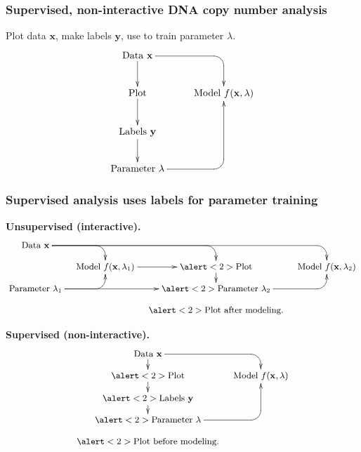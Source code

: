\documentclass{beamer}
\begin{document}
\begin{frame}
  \frametitle{Supervised, non-interactive DNA copy number analysis}
  Plot data $\mathbf x$, make labels $\mathbf y$, use to train
  parameter $\lambda$.
  \begin{displaymath}
  \xymatrix{
    \text{Data $\mathbf x$}
    \ar `[r] [dr] 
    \ar [d]
    & \text{ }
    \\
    \text{Plot} 
    \ar [d]
    & 
    \text{Model $f(\mathbf x, \lambda)$} 
    \\
    \text{Labels $\mathbf y$}       
    \ar [d]
    \\
    \text{Parameter $\lambda$} 
    \ar `r[ruu] [ruu]
    & \text{ }
  }
  \end{displaymath}
\end{frame}

\begin{frame}
  \frametitle{Supervised analysis uses labels for parameter training}

    \textbf{Unsupervised (interactive).}
  \begin{displaymath}
    \small
  \xymatrix@=0.3cm{
    \text{Data $\mathbf x$}
    \ar `[r] [dr] 
    \ar `r[rr] [drr] 
    \ar `r[rrr] [drrr] 
    & \text{ }
    & \text{ }
    & \text{ }
    \\
    & 
    \text{Model $f(\mathbf x, \lambda_1)$} 
    \ar [r]
    & 
    \alert<2>{\text{Plot}}
    \ar[d]
    &
    \text{Model $f(\mathbf x, \lambda_2)$} 
    \\
    \text{Parameter $\lambda_1$}
    \ar `r[ru] [ru]
    \ar [rr]
    & \text{ }
    & \alert<2>{\text{Parameter $\lambda_2$}}
    \ar `r[ru] [ru] \\
    & &   \alert<2>{\text{Plot after modeling.}}
  }
  \end{displaymath}
  
  \textbf{Supervised (non-interactive).}
  \begin{displaymath}
    \small
  \xymatrix@=0.3cm{
    \text{Data $\mathbf x$}
    \ar `[r] [dr] 
    \ar [d]
    & \text{ }
    \\
    \alert<2>{\text{Plot} }
    \ar [d]
    & 
    \text{Model $f(\mathbf x, \lambda)$} 
    \\
    \alert<2>{\text{Labels $\mathbf y$}       }
    \ar [d]
    \\
    \alert<2>{\text{Parameter $\lambda$} }
    \ar `r[ruu] [ruu]
    & \text{ }\\
    \alert<2>{\text{Plot before modeling.}}
  }
\end{displaymath}

\end{frame}
\end{document}
